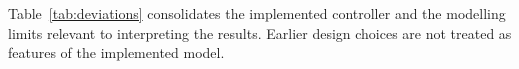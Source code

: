 \section{\texorpdfstring{}{Implemented Configuration and Scope}}
\label{sec:impl_deviations}

\subsection{\texorpdfstring{}{Configuration and modelling limits}}
\label{sec:deviations_table}

\begin{revisedblock}
Table~\ref{tab:deviations} consolidates the implemented
controller and the modelling limits relevant to interpreting
the results. Earlier design choices are not treated as
features of the implemented model.
\end{revisedblock}
